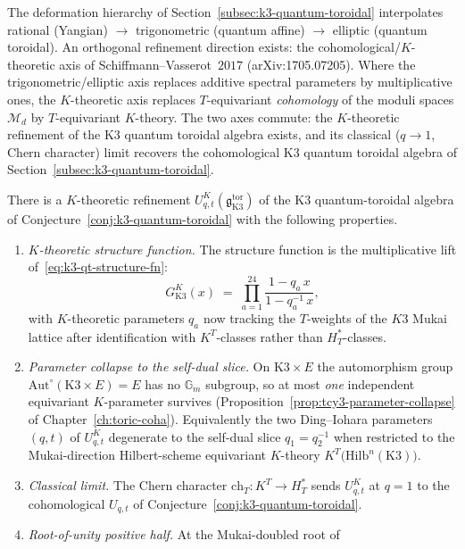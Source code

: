 The deformation hierarchy of
Section~\ref{subsec:k3-quantum-toroidal} interpolates rational
(Yangian) $\to$ trigonometric (quantum affine) $\to$ elliptic (quantum
toroidal). An orthogonal refinement direction exists: the
cohomological/$K$-theoretic axis of Schiffmann--Vasserot~$2017$
(arXiv:1705.07205). Where the trigonometric/elliptic axis replaces
additive spectral parameters by multiplicative ones, the $K$-theoretic
axis replaces $T$-equivariant \emph{cohomology} of the moduli spaces
$\mathcal{M}_d$ by $T$-equivariant $K$-theory. The two axes commute:
the $K$-theoretic refinement of the K3 quantum toroidal algebra
exists, and its classical ($q \to 1$, Chern character) limit recovers
the cohomological K3 quantum toroidal algebra of
Section~\ref{subsec:k3-quantum-toroidal}.

\begin{conjecture}
\label{conj:k3qt-k-theoretic}
\ClaimStatusConjectured
There is a $K$-theoretic refinement
$U^{K}_{q, t}(\mathfrak{g}_{\mathrm{K3}}^{\mathrm{tor}})$ of the K3
quantum-toroidal algebra of Conjecture~\ref{conj:k3-quantum-toroidal}
with the following properties.
\begin{enumerate}[label=\textup{(\roman*)}]
\item \emph{$K$-theoretic structure function.} The structure function
is the multiplicative lift of~\eqref{eq:k3-qt-structure-fn}:
\[
 G^K_{\mathrm{K3}}(x) \;=\;
 \prod_{a=1}^{24} \frac{1 - q_a\, x}{1 - q_a^{-1}\, x},
\]
with $K$-theoretic parameters $q_a$ now tracking the $T$-weights of
the $K3$ Mukai lattice after identification with $K^T$-classes rather
than $H^*_T$-classes.
\item \emph{Parameter collapse to the self-dual slice.} On
$\mathrm{K3}\times E$ the automorphism group
$\mathrm{Aut}^\circ(\mathrm{K3}\times E) = E$ has no $\mathbb{G}_m$
subgroup, so at most \emph{one} independent equivariant $K$-parameter
survives (Proposition~\ref{prop:tcy3-parameter-collapse} of
Chapter~\ref{ch:toric-coha}). Equivalently the two Ding--Iohara
parameters $(q, t)$ of $U^K_{q,t}$ degenerate to the self-dual slice
$q_1 = q_2^{-1}$ when restricted to the Mukai-direction Hilbert-scheme
equivariant $K$-theory
$K^T\bigl( \mathrm{Hilb}^n(\mathrm{K3}) \bigr)$.
\item \emph{Classical limit.} The Chern character
$\mathrm{ch}_T : K^T \to H^*_T$ sends
$U^K_{q, t}$ at $q = 1$ to the cohomological $U_{q, t}$ of
Conjecture~\ref{conj:k3-quantum-toroidal}.
\item \emph{Root-of-unity positive half.} At the Mukai-doubled root of

\end{enumerate}
\end{conjecture}
